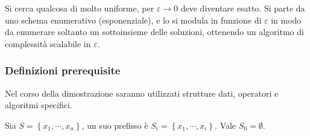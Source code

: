 Si cerca qualcosa di molto uniforme, per $\varepsilon \to 0$ deve diventare esatto. Si parte da uno schema enumerativo (esponenziale), e lo si modula in funzione di $\varepsilon$ in modo da enumerare soltanto un sottoinsieme delle soluzioni, ottenendo un algoritmo di complessità scalabile in $\varepsilon$.

\subsubsection{Definizioni prerequisite}

Nel corso della dimostrazione saranno utilizzati strutture dati, operatori e algoritmi specifici.

Sia $
S = \left\{ x_1, \cdots, x_n \right\}
$, un suo prefisso è $
S_i = \left\{ x_1, \cdots, x_i \right\}
$.
Vale $ S_0 = \emptyset $.

